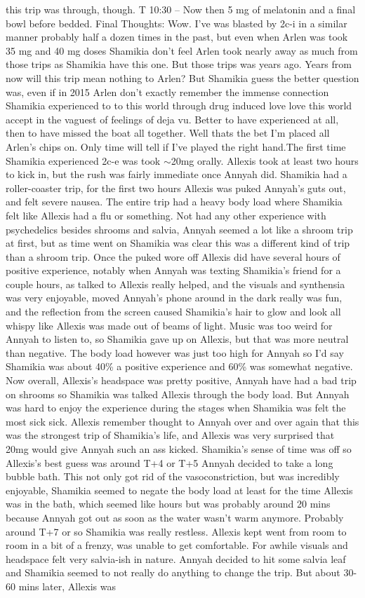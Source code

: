 \documentclass[12pt]{book}
\begin{document}
this trip was through, though. T 10:30 -- Now then 5 mg of melatonin and a final bowl before bedded. Final Thoughts: Wow. I've was blasted by 2c-i in a similar manner probably half a dozen times in the past, but even when Arlen was took 35 mg and 40 mg doses Shamikia don't feel Arlen took nearly away as much from those trips as Shamikia have this one. But those trips was years ago. Years from now will this trip mean nothing to Arlen? But Shamikia guess the better question was, even if in 2015 Arlen don't exactly remember the immense connection Shamikia experienced to to this world through drug induced love love this world accept in the vaguest of feelings of deja vu. Better to have experienced at all, then to have missed the boat all together. Well thats the bet I'm placed all Arlen's chips on. Only time will tell if I've played the right hand.The first time Shamikia experienced 2c-e was took $\sim$20mg orally. Allexis took at least two hours to kick in, but the rush was fairly immediate once Annyah did. Shamikia had a roller-coaster trip, for the first two hours Allexis was puked Annyah's guts out, and felt severe nausea. The entire trip had a heavy body load where Shamikia felt like Allexis had a flu or something. Not had any other experience with psychedelics besides shrooms and salvia, Annyah seemed a lot like a shroom trip at first, but as time went on Shamikia was clear this was a different kind of trip than a shroom trip. Once the puked wore off Allexis did have several hours of positive experience, notably when Annyah was texting Shamikia's friend for a couple hours, as talked to Allexis really helped, and the visuals and synthensia was very enjoyable, moved Annyah's phone around in the dark really was fun, and the reflection from the screen caused Shamikia's hair to glow and look all whispy like Allexis was made out of beams of light. Music was too weird for Annyah to listen to, so Shamikia gave up on Allexis, but that was more neutral than negative. The body load however was just too high for Annyah so I'd say Shamikia was about 40\% a positive experience and 60\% was somewhat negative. Now overall, Allexis's headspace was pretty positive, Annyah have had a bad trip on shrooms so Shamikia was talked Allexis through the body load. But Annyah was hard to enjoy the experience during the stages when Shamikia was felt the most sick sick. Allexis remember thought to Annyah over and over again that this was the strongest trip of Shamikia's life, and Allexis was very surprised that 20mg would give Annyah such an ass kicked. Shamikia's sense of time was off so Allexis's best guess was around T+4 or T+5 Annyah decided to take a long bubble bath. This not only got rid of the vasoconstriction, but was incredibly enjoyable, Shamikia seemed to negate the body load at least for the time Allexis was in the bath, which seemed like hours but was probably around 20 mins because Annyah got out as soon as the water wasn't warm anymore. Probably around T+7 or so Shamikia was really restless. Allexis kept went from room to room in a bit of a frenzy, was unable to get comfortable. For awhile visuals and headspace felt very salvia-ish in nature. Annyah decided to hit some salvia leaf and Shamikia seemed to not really do anything to change the trip. But about 30-60 mins later, Allexis was 
\end{document}
